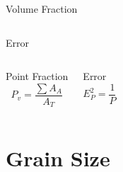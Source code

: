 \documentclass[10pt]{beamer}
\begin{document}
{\begin{frame}[fragile]{Volume Fraction}
\begin{columns}[T,onlytextwidth]
\begin{block}{Error}
\end{block}

\end{columns}

  \begin{columns}[T,onlytextwidth]
\begin{block}{Point Fraction}
\begin{equation*}
P_{v} = \dfrac{\sum A_{A}}{A_{T}}
\end{equation*} 
\end{block}
 

\begin{block}{Error}
\begin{equation*}
E_{P}^{2} = \dfrac{1}{P}
\end{equation*} 
\end{block}

\end{columns}


 
    
\end{frame}
}
\section{Grain Size}
\end{document}
